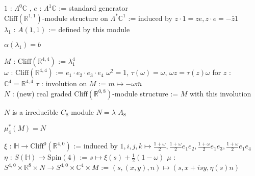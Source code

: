 \documentclass[dvipdfmx]{jsarticle}
\begin{document}
\begin{Definition}
\itemdefi
  \Let \(1\) : \(\Lambda^{0} \mathbb{C}\) , \(e\) : \(\Lambda^{1} \mathbb{C}\) := standard generator \\
  \Define \(\text{Cliff}(\mathbb{R}^{1,1})\)-module structure on \(\Lambda^* \mathbb{C}^1\) := induced by \(z \cdot 1 = ze , z \cdot e = - \bar{z} 1\) \\
  \Define \(\lambda_1\) : \(A(1,1)\) := defined by this module
\end{Definition}

\begin{Theorem}
\itemprop
  \Then \(\alpha(\lambda_1) = b\) \\
\end{Theorem}

\begin{Definition}
\itemdefi
  \Let \(M\) : \(\text{Cliff}(\mathbb{R}^{4,4})\) := \(\lambda_1 ^4\) \\
  \Let \(\omega\) : \(\text{Cliff}(\mathbb{R}^{4,4})\) := \(e_1 \cdot e_2 \cdot e_3 \cdot e_4\)
\itemprop
  \Then \(\omega^2 = 1\), \(\tau(\omega) = \omega\), \(\omega z = \tau(z) \omega\) for \(z\) : \(\mathbb{C}^4 = \mathbb{R}^{4,4}\)
\itemdefi
  \Define \(\tau\) : involution on \(M\) := \(m \mapsto -\omega \bar{m}\) \\
  \Define \(N\) : (new) real graded \(\text{Cliff}(\mathbb{R}^{0,8})\)-module structure := \(M\) with this involution
\end{Definition}

\begin{Theorem}
\itemprop
  \Then \(N\) is a irreducible \(C_8\)-module
\itemprop
  \Then \(N = \lambda\) \(A_8\)
\end{Theorem}

\begin{Theorem}
\itemprop
  \Then \(\mu_4^*(M) = N\)
\end{Theorem}

\begin{Definition}
\itemdefi
  \Define \(\xi\) : \(\mathbb{H} \to \text{Cliff}^{0}(\mathbb{R}^{4,0})\) := induced by \(1 , i , j , k \mapsto \frac{1 + \omega}{2}, \frac{1 + \omega}{2} e_1 e_2, \frac{1 + \omega}{2} e_1 e_3, \frac{1 + \omega}{2} e_1 e_4\) \\
  \Define \(\eta\) : \(S(\mathbb{H}) \to \text{Spin}(4)\) := \(s \mapsto \xi(s) + \frac{1}{2}(1 - \omega)\)
\itemdefi
  \Define \(\mu\) : \(S^{4,0} \times \mathbb{R}^8 \times N \to S^{4,0} \times \mathbb{C}^4 \times M\) := \((s,(x,y),n) \mapsto (s, x+isy, \eta(s)n)\)
\end{Definition}
\end{document}
